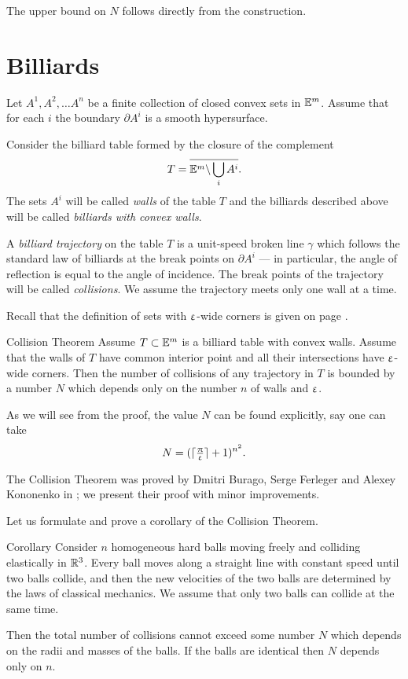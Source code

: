 The upper bound on $N$ follows directly from the construction.
\qeds



\section{Billiards}

Let $A^1,A^2,\dots A^n$ be a finite collection of closed convex sets in $\mathbb{E}^m$.
Assume that for each $i$
the boundary $\partial A^i$ is a smooth hypersurface.

Consider the billiard table formed by the closure of the complement 
$$T=\overline{\mathbb{E}^m\backslash \bigcup_{i} A^i}.$$
The sets $A^i$ will be called {}\emph{walls} of the table $T$ 
and the billiards described above will be called {}\emph{billiards with convex walls}.

A {}\emph{billiard trajectory} 
on the table $T$ is a unit-speed broken line $\gamma$ 
which follows  the
standard law of billiards 
at the break points on $\partial A^i$ 
--- in particular, the angle of reflection is equal to the angle of incidence.
The break points of the trajectory will be called {}\emph{collisions}.
We assume the trajectory meets only one wall at a time.

Recall that the definition of sets with $\upvarepsilon$-wide corners is given on page \pageref{page:wide corners}.

\begin{thm}{Collision Theorem}\label{thm:collision}
Assume $T\subset\EE^m$
is a billiard table with convex walls.
Assume that the walls of $T$ have common interior point 
and all their intersections have $\upvarepsilon$-wide corners.
Then the number of collisions of any trajectory in  $T$  is bounded
by a number $N$ which depends only on the number $n$ of walls and $\upvarepsilon$.
\end{thm}

As we will see from the proof,
the value $N$ can be found explicitly,
say one can take 
\[N=(\lceil\tfrac{\uppi}{\upvarepsilon}\rceil+1)^{n^2}.\]

The Collision Theorem was proved by Dmitri Burago, Serge Ferleger and Alexey Kononenko in \cite{BFK};
we present their proof with minor improvements.

Let us formulate and prove a corollary of the  Collision Theorem.

\begin{thm}{Corollary}\label{cor:balls}
Consider $n$ homogeneous hard balls
moving freely and colliding
elastically in $\mathbb{R}^3$. 
Every ball moves
along a straight line with constant speed until two balls collide, and then
the new velocities of the two balls are determined by the
laws of classical mechanics. 
We assume that only two balls can collide at the same time.

Then the total number of collisions cannot exceed some number $N$ which depends on the radii and masses of the balls.
If the balls are identical then $N$ depends only on $n$.
\end{thm}


